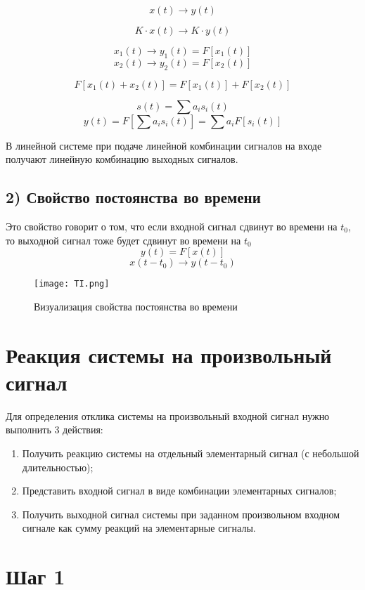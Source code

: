 \[
x(t) \rightarrow y(t)
\]

\[
K \cdot x(t) \rightarrow K \cdot y(t)
\]

\[
x_1(t) \rightarrow y_1(t) = F[x_1(t)]
\]
\[
x_2(t) \rightarrow y_2(t) = F[x_2(t)]
\]

\[
F[x_1(t) + x_2(t)] = F[x_1(t)] + F[x_2(t)]
\]

\[
s(t) = \sum a_i s_i(t)
\]
\[
y(t) = F\left[\sum a_i s_i(t)\right] = \sum a_i F[s_i(t)]
\]

В линейной системе при подаче линейной комбинации сигналов на входе получают линейную комбинацию выходных сигналов.

\subsection*{2) Свойство постоянства во времени}

Это свойство говорит о том, что если входной сигнал сдвинут во времени на $t_0$, то выходной сигнал тоже будет сдвинут во времени
на $t_0$
\[
y(t) = F[x(t)]
\]
\[
x(t - t_0) \rightarrow y(t - t_0)
\]

\begin{figure}[H]
    \centering
    \texttt{[image: TI.png]}
    \caption{Визуализация свойства постоянства во времени}
\end{figure}

\section*{Реакция системы на произвольный сигнал}

Для определения отклика системы на произвольный входной сигнал нужно выполнить 3 действия:

\begin{enumerate}
    \item Получить реакцию системы на отдельный элементарный сигнал (с небольшой длительностью);
    \item Представить входной сигнал в виде комбинации элементарных сигналов;
    \item Получить выходной сигнал системы при заданном произвольном входном сигнале как сумму реакций на элементарные сигналы.
\end{enumerate}

\section*{Шаг 1}

